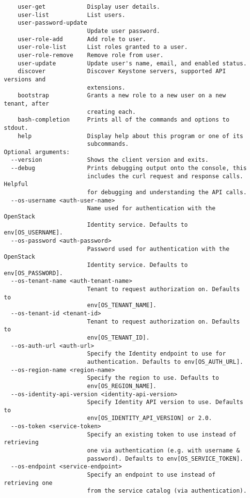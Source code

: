 \documentclass[a4paper,left=1.5cm,right=1.5cm,11pt]{article}
\begin{document}
\begin{lstlisting}
    user-get            Display user details.
    user-list           List users.
    user-password-update
                        Update user password.
    user-role-add       Add role to user.
    user-role-list      List roles granted to a user.
    user-role-remove    Remove role from user.
    user-update         Update user's name, email, and enabled status.
    discover            Discover Keystone servers, supported API versions and
                        extensions.
    bootstrap           Grants a new role to a new user on a new tenant, after
                        creating each.
    bash-completion     Prints all of the commands and options to stdout.
    help                Display help about this program or one of its
                        subcommands.
Optional arguments:
  --version             Shows the client version and exits.
  --debug               Prints debugging output onto the console, this
                        includes the curl request and response calls. Helpful
                        for debugging and understanding the API calls.
  --os-username <auth-user-name>
                        Name used for authentication with the OpenStack
                        Identity service. Defaults to env[OS_USERNAME].
  --os-password <auth-password>
                        Password used for authentication with the OpenStack
                        Identity service. Defaults to env[OS_PASSWORD].
  --os-tenant-name <auth-tenant-name>
                        Tenant to request authorization on. Defaults to
                        env[OS_TENANT_NAME].
  --os-tenant-id <tenant-id>
                        Tenant to request authorization on. Defaults to
                        env[OS_TENANT_ID].
  --os-auth-url <auth-url>
                        Specify the Identity endpoint to use for
                        authentication. Defaults to env[OS_AUTH_URL].
  --os-region-name <region-name>
                        Specify the region to use. Defaults to
                        env[OS_REGION_NAME].
  --os-identity-api-version <identity-api-version>
                        Specify Identity API version to use. Defaults to
                        env[OS_IDENTITY_API_VERSION] or 2.0.
  --os-token <service-token>
                        Specify an existing token to use instead of retrieving
                        one via authentication (e.g. with username &
                        password). Defaults to env[OS_SERVICE_TOKEN].
  --os-endpoint <service-endpoint>
                        Specify an endpoint to use instead of retrieving one
                        from the service catalog (via authentication).

\end{lstlisting}
\end{document}
